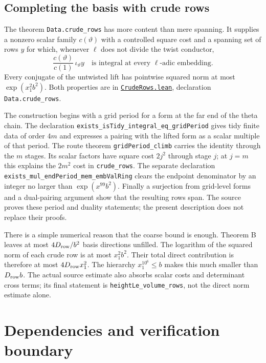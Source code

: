 \documentclass[11pt,oneside,openany]{amsbook}
\theoremstyle{remark}
\numberwithin{equation}{section}
\newcommand{\ghroot}{https://github.com/lsernau/grh-lean/blob/}
\newcommand{\ghrev}{72fead102f663d5c7a407964a13dc0cf9d977207}
\newcommand{\leanfile}[2]{%
  \href{\ghroot\ghrev/grh-compact/src/#1}{\nolinkurl{#2}}}
\begin{document}
\section{Completing the basis with crude rows}
\label{sec:crude-rows}
The theorem \texttt{Data.crude\_rows} has more content
than mere spanning. It supplies a nonzero scalar family
$c(\vartheta)$ with a controlled square cost and a
spanning set of rows $y$ for which, whenever $\ell$ does
not divide the twist conductor,
\begin{equation}
\label{eq:crude-integral}
\frac{c(\vartheta)}{c(1)}
\,\iota_\vartheta y
\quad\text{is integral at every }\ell\text{-adic embedding}.
\end{equation}
Every conjugate of the untwisted lift has pointwise
squared norm at most $\exp(x_1^2b^2)$. Both properties
are in \leanfile{New/Exchange/CrudeRows.lean}%
{CrudeRows.lean}, declaration \texttt{Data.crude\_rows}.

The construction begins with a grid period for a form
at the far end of the theta chain. The declaration
\texttt{exists\_isTidy\_integral\_eq\_gridPeriod}
gives tidy finite data of order $4m$ and expresses a
pairing with the lifted form as a scalar multiple of
that period. The route theorem
\texttt{gridPeriod\_climb} carries the identity through
the $m$ stages. Its scalar factors have square cost
$2j^2$ through stage $j$; at $j=m$ this explains the
$2m^2$ cost in \texttt{crude\_rows}.
The separate declaration
\texttt{exists\_mul\_endPeriod\_mem\_embValRing}
clears the endpoint denominator by an integer no larger
than $\exp(x^{99}b^2)$. Finally a surjection from
grid-level forms and a dual-pairing argument show that
the resulting rows span. The source proves these period
and duality statements; the present description does not
replace their proofs.

There is a simple numerical reason that the coarse bound
is enough. Theorem B leaves at most
$4D_{\rm row}/b^2$ basis directions unfilled.
The logarithm of the squared norm of each crude row is
at most $x_1^2b^2$. Their total direct contribution is
therefore at most $4D_{\rm row}x_1^2$.
The hierarchy $x_1^{10^6}\le b$ makes this much smaller
than $D_{\rm row}b$. The actual source estimate also
absorbs scalar costs and determinant cross terms; its
final statement is \texttt{heightLe\_volume\_rows},
not the direct norm estimate alone.

\chapter{Dependencies and verification boundary}
\label{ch:boundary}
\end{document}
